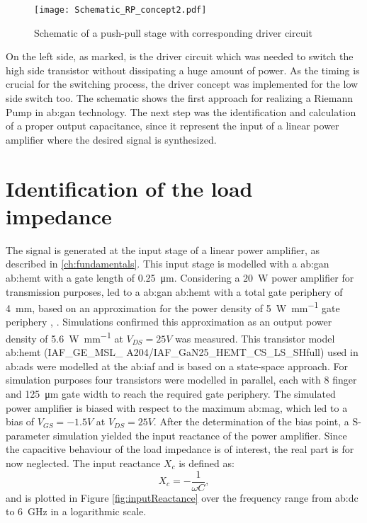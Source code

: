 \begin{figure}[ht]
	\centering
  \texttt{[image: Schematic\_RP\_concept2.pdf]}
	\caption{Schematic of a push-pull stage with corresponding driver circuit}
	\label{fig:SchematicRiemannPump}
\end{figure}

On the left side, as marked, is the driver circuit which was needed to switch the high side transistor without dissipating a huge amount of power.
As the timing is crucial for the switching process, the driver concept was implemented for the low side switch too.
The schematic shows the first approach for realizing a Riemann Pump in \gls{ab:gan} technology.
The next step was the identification and calculation of a proper output capacitance, since it represent the input of a linear power amplifier where the desired signal is synthesized.
 
\section{Identification of the load impedance}
The signal is generated at the input stage of a linear power amplifier, as described in \ref{ch:fundamentals}.
This input stage is modelled with a \gls{ab:gan} \gls{ab:hemt} with a gate length of \SI{0.25}{\micro \meter}.
Considering a \SI{20}{\watt} power amplifier for transmission purposes, led to a \gls{ab:gan} \gls{ab:hemt} with a total gate periphery of \SI{4}{\milli \metre}, based on an approximation for the power density of \SI[per-mode=fraction]{5}{\watt\per\milli\metre} gate periphery  \cite{Maroldt2010}, \cite{GaNBook}.
Simulations confirmed this approximation as an output power density of \SI[per-mode=fraction]{5.6}{\watt\per\milli\metre} at $V_{DS} = 25 V$ was measured.
This transistor model \gls{ab:hemt} (IAF\_GE\_MSL\_ A204/IAF\_GaN25\_HEMT\_CS\_LS\_SHfull) used in \gls{ab:ads} were modelled at the \gls{ab:iaf}\cite{model} and is based on a state-space approach. 
For simulation purposes four transistors were modelled in parallel, each with 8 finger and \SI{125}{\micro \metre} gate width to reach the required gate periphery.
The simulated power amplifier is biased with respect to the maximum \gls{ab:mag}, which led to a bias of $V_{GS} = -1.5 V$ at $V_{DS} = 25 V$.
After the determination of the bias point, a S-parameter simulation yielded the input reactance of the power amplifier.
Since the capacitive behaviour of the load impedance is of interest, the real part is for now neglected.
The input reactance $X_c$ is defined as:
\begin{equation}
	X_c = -\frac{1}{\omega C},
\end{equation}
\label{eq:reactance}
and is plotted in Figure \ref{fig:inputReactance} over the frequency range from \gls{ab:dc} to \SI{6}{\giga \hertz} in a logarithmic scale.

